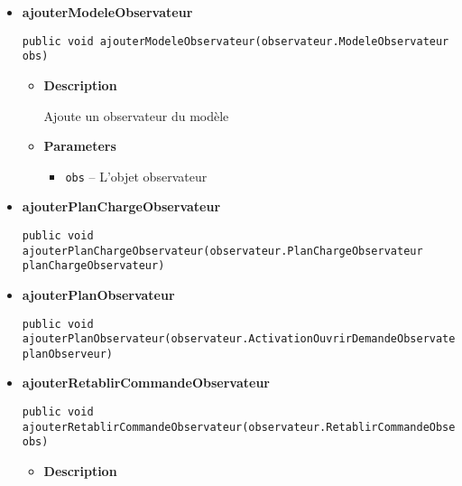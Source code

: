 \documentclass[11pt,a4paper]{report}
\begin{document}
{{{{{{\begin{itemize}
{\begin{itemize}
{Ajoute une commande à l'historique
}
\item{
{\bf  Parameters}
  \begin{itemize}
   \item{
\texttt{commande} -- Une commande exécutée}
  \end{itemize}
}%
\end{itemize}
}%
\item{ 
\hypertarget{controleur.ControleurDonnees.ajouterModeleObservateur(controleur.observateur.ModeleObservateur)}{{\bf  ajouterModeleObservateur}\\}
\begin{lstlisting}[frame=none]
public void ajouterModeleObservateur(observateur.ModeleObservateur obs)\end{lstlisting} %
\begin{itemize}
\item{
{\bf  Description}

Ajoute un observateur du modèle
}
\item{
{\bf  Parameters}
  \begin{itemize}
   \item{
\texttt{obs} -- L'objet observateur}
  \end{itemize}
}%
\end{itemize}
}%
\item{ 
\hypertarget{controleur.ControleurDonnees.ajouterPlanChargeObservateur(controleur.observateur.PlanChargeObservateur)}{{\bf  ajouterPlanChargeObservateur}\\}
\begin{lstlisting}[frame=none]
public void ajouterPlanChargeObservateur(observateur.PlanChargeObservateur planChargeObservateur)\end{lstlisting} %
}%
\item{ 
\hypertarget{controleur.ControleurDonnees.ajouterPlanObservateur(controleur.observateur.ActivationOuvrirDemandeObservateur)}{{\bf  ajouterPlanObservateur}\\}
\begin{lstlisting}[frame=none]
public void ajouterPlanObservateur(observateur.ActivationOuvrirDemandeObservateur planObserveur)\end{lstlisting} %
}%
\item{ 
\hypertarget{controleur.ControleurDonnees.ajouterRetablirCommandeObservateur(controleur.observateur.RetablirCommandeObservateur)}{{\bf  ajouterRetablirCommandeObservateur}\\}
\begin{lstlisting}[frame=none]
public void ajouterRetablirCommandeObservateur(observateur.RetablirCommandeObservateur obs)\end{lstlisting} %
\begin{itemize}
\item{
{\bf  Description}

}
\end{itemize}}
\end{itemize}}}}}}}
\end{document}
